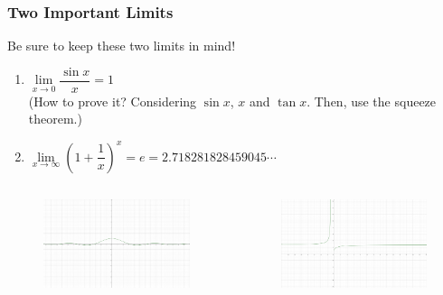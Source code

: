 \documentclass{beamer}
\begin{document}
	\begin{frame}
		\frametitle{Two Important Limits}
		Be sure to keep these two limits in mind!
		\begin{enumerate}
			\item $\lim\limits_{\textit{x} \to 0}\dfrac{\sin{x}}{x} = 1$\\
				(How to prove it? Considering $\sin{x}$, $x$ and $\tan{x}$. Then, use the squeeze theorem.)
			\item $\lim\limits_{\textit{x} \to \infty}(1 + \dfrac{1}{x})^{x} = e = 2.718281828459045\cdots$
		\end{enumerate}
		\begin{columns}[c] %
			\begin{column}{0.5\textwidth} %
				\begin{figure}
					\includegraphics[width=1\linewidth]{bbb.jpg}
				\end{figure}
			\end{column}
			\begin{column}{0.5\textwidth} %
				\begin{figure}
					\includegraphics[width=1\linewidth]{aaa.jpg}
				\end{figure}
			\end{column}
	\end{columns}
	\end{frame}
	
\end{document}

